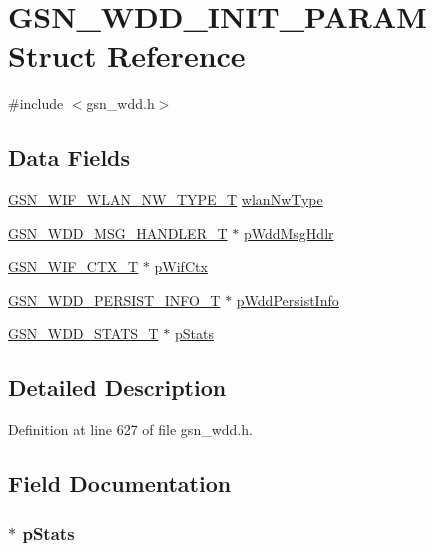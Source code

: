 \hypertarget{a00276}{
\section{GSN\_\-WDD\_\-INIT\_\-PARAM Struct Reference}
\label{a00276}
}


{\ttfamily \#include $<$gsn\_\-wdd.h$>$}

\subsection*{Data Fields}
\begin{DoxyCompactItemize}
\item 
\hyperlink{a00677_gabc852e0cb262314c5f307a3e9802921e}{GSN\_\-WIF\_\-WLAN\_\-NW\_\-TYPE\_\-T} \hyperlink{a00276_a611759f3eaa5817846fb74212f7aaea5}{wlanNwType}
\item 
\hyperlink{a00279}{GSN\_\-WDD\_\-MSG\_\-HANDLER\_\-T} $\ast$ \hyperlink{a00276_a6978c51a66d7b07a4fa1a13f9af82548}{pWddMsgHdlr}
\item 
\hyperlink{a00323}{GSN\_\-WIF\_\-CTX\_\-T} $\ast$ \hyperlink{a00276_aa8e90d3c80ca98d22454e0840b8cf2d2}{pWifCtx}
\item 
\hyperlink{a00282}{GSN\_\-WDD\_\-PERSIST\_\-INFO\_\-T} $\ast$ \hyperlink{a00276_abe3cbdc445f6164df50177eecd227c8c}{pWddPersistInfo}
\item 
\hyperlink{a00301}{GSN\_\-WDD\_\-STATS\_\-T} $\ast$ \hyperlink{a00276_a2025526a9c36139e30df4edb6fe32c64}{pStats}
\end{DoxyCompactItemize}


\subsection{Detailed Description}


Definition at line 627 of file gsn\_\-wdd.h.



\subsection{Field Documentation}
\hypertarget{a00276_a2025526a9c36139e30df4edb6fe32c64}{
\subsubsection[{pStats}]{$\ast$ {\bf pStats}}}
\label{a00276_a2025526a9c36139e30df4edb6fe32c64}


